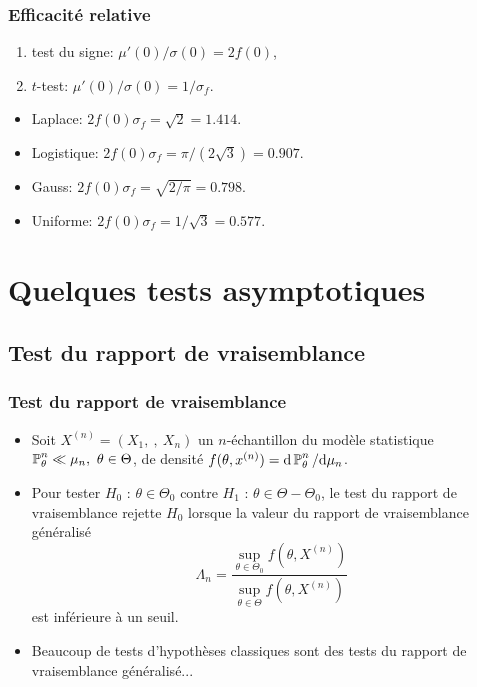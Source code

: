 \begin{frame}
\frametitle{Efficacité relative}
\begin{enumerate}
\item test du signe: $\mu'(0)/\sigma(0)=2 f(0)$,
\item $t$-test: $\mu'(0)/\sigma(0)=1/\sigma_f$.
\end{enumerate}

\begin{itemize}
\item Laplace: $2 f(0) \sigma_f  = \sqrt{2}=1.414$.
\item Logistique: $2 f(0) \sigma_f  = \pi/(2\sqrt{3})=0.907$.
\item Gauss: $2 f(0) \sigma_f = \sqrt{2/\pi}=0.798$.
\item Uniforme: $2 f(0) \sigma_f = 1/\sqrt{3}=0.577$.
\end{itemize}
\end{frame}

\section{Quelques tests asymptotiques}

\subsection{Test du rapport de vraisemblance}
\begin{frame}
\frametitle{Test du rapport de vraisemblance}
 \begin{itemize}
 \item Soit  $X^{(n)}= (X_{1},\ ,\ X_{n})$ un $n$-échantillon du modèle statistique $\PP_{\theta}^{n}\ll\mu_{n},\ \theta\in\Theta$, de densité  $f(\theta,x^{(n)})= \mathrm{d} \operatorname{{\mathbb P}}_{\theta}^{n}/ \mathrm{d} \mu_{n}$.
 \item Pour tester $H_{0}$ : $\theta\in\Theta_{0}$  contre $H_{1}$ : $\theta\in\Theta-\Theta_{0}$, le test du \alert{rapport de vraisemblance} rejette $H_{0}$ lorsque la valeur du \alert{rapport de vraisemblance généralisé}
$$
\Lambda_{n}=\frac{\sup_{\theta\in\Theta_{0}}f(\theta,X^{(n)})}{\sup_{\theta\in\Theta}f(\theta,X^{(n)})}
$$
est \alert{inférieure} à un seuil.
\item Beaucoup de tests d'hypothèses classiques sont des tests du rapport de vraisemblance généralisé...
\end{itemize}
\end{frame}

